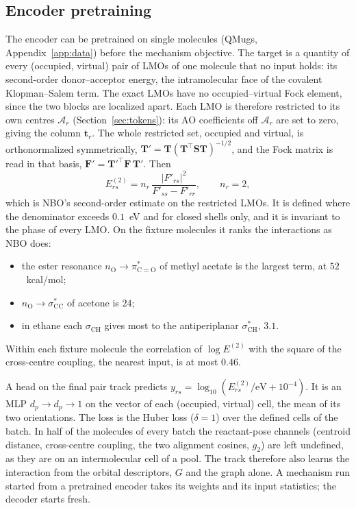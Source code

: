\documentclass[11pt,a4paper]{article}
\newcommand{\vb}[1]{\bm{#1}}
\begin{document}
\subsection{Encoder pretraining}
\label{sec:pretrain}
The encoder can be pretrained on single molecules (QMugs, Appendix~\ref{app:data}) before the mechanism objective. The target is a quantity of every (occupied, virtual) pair of LMOs of one molecule that no input holds: its second-order donor--acceptor energy, the intramolecular face of the covalent Klopman--Salem term. The exact LMOs have no occupied--virtual Fock element, since the two blocks are localized apart. Each LMO is therefore restricted to its own centres $\mathcal{A}_r$ (Section~\ref{sec:tokens}): its AO coefficients off $\mathcal{A}_r$ are set to zero, giving the column $\vb{t}_r$. The whole restricted set, occupied and virtual, is orthonormalized symmetrically, $\vb{T}'=\vb{T}(\vb{T}^{\top}\vb{S}\vb{T})^{-1/2}$, and the Fock matrix is read in that basis, $\vb{F}'=\vb{T}'^{\top}\vb{F}\,\vb{T}'$. Then
\begin{equation}
E^{(2)}_{rs}=n_r\,\frac{|F'_{rs}|^{2}}{F'_{ss}-F'_{rr}},\qquad n_r=2,
\end{equation}
which is NBO's second-order estimate on the restricted LMOs. It is defined where the denominator exceeds $0.1$~eV and for closed shells only, and it is invariant to the phase of every LMO. On the fixture molecules it ranks the interactions as NBO does:
\begin{itemize}[nosep]
\item the ester resonance $n_{\mathrm{O}}\to\pi^{*}_{\mathrm{C=O}}$ of methyl acetate is the largest term, at $52$~kcal/mol;
\item $n_{\mathrm{O}}\to\sigma^{*}_{\mathrm{CC}}$ of acetone is $24$;
\item in ethane each $\sigma_{\mathrm{CH}}$ gives most to the antiperiplanar $\sigma^{*}_{\mathrm{CH}}$, $3.1$.
\end{itemize}
Within each fixture molecule the correlation of $\log E^{(2)}$ with the square of the cross-centre coupling, the nearest input, is at most $0.46$.

A head on the final pair track predicts $y_{rs}=\log_{10}(E^{(2)}_{rs}/\mathrm{eV}+10^{-4})$. It is an MLP $d_p\to d_p\to 1$ on the vector of each (occupied, virtual) cell, the mean of its two orientations. The loss is the Huber loss ($\delta=1$) over the defined cells of the batch. In half of the molecules of every batch the reactant-pose channels (centroid distance, cross-centre coupling, the two alignment cosines, $g_2$) are left undefined, as they are on an intermolecular cell of a pool. The track therefore also learns the interaction from the orbital descriptors, $G$ and the graph alone. A mechanism run started from a pretrained encoder takes its weights and its input statistics; the decoder starts fresh.
\end{document}
